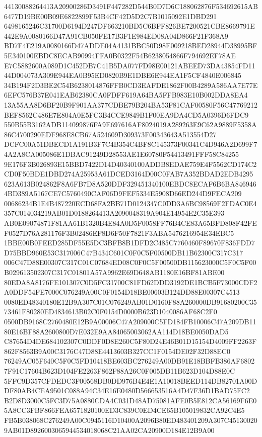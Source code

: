 \documentclass[UTF8,fontset=fandol,zihao=-4,a4paper]{ctexart}
\begin{document}
{{44130088264413A20900286D3491F447282D544B0D7D6C188062876F534692615AB6477D19BE00B09E6822899F53B4CF42D5D2C7B1015092E1DBD291
6498165246C31700D6194D247DF663210BD5C6BFF826BE7200521CBE8669791E442E9A0080166D47A91CB050FE17B3F1E984ED08A04D866F21F368A9
BD7F4E219A0080166D47ADDE04A4131BBC50D98E009218BED28944D38995BF5E340100EBDC8ECAB90994FFA0B0322F54B6238054866F794692EF78AE
E7C5882600A089D1C452DB7C41B5DA077FD98E00121ABEED73DA43854FD1144D004073A309E944EA0B95ED0820B9E1DBE6E944EA1F5CF4840E006845
34B194F2D3BE2C54B6238014876FFB0CD3EAFDE1862F00B4289A586AA7E77E6EFC576B37E041EAB62380CA0FDFF619A64BA5FFB983E10B002DDA8EA4
13A55AA8D6BF20B9F901AA377CDBE79B204BA53F81CAF00580F56C47769212BEF8562C486E7E804A0E5FC3B4CCE9849B1F00EA9DA4CD5A0396D6FDC9
550B55B3162ADB114099876FA9E697616AF8024019A289263E9C62A9889F5358A86C4700290EDF968E8CB67A524609D309373F00343643A513554D27
DCFC00A51DBECD1A191B3F7C4B354C4BF8C145373F00341C4D946A2D699F74A2A8CA005086E1DBAC91249D28553AE1E60780F54413491FFF58C84255
9E176F3B026893E15BBD7422D14D40340100ADDB8EDAE759E4F5562CD174C2CD0F50BDE1DBD274A25953A61DCED3164D00C0FAB7A352BDAD2EDB4295
623A613B024862F8A6FB7D8A520DDF329451340100EBDC8ECAF6B6BA8469464BD389A5167CE7C5760490CAF06D9FEF5334E5908D66ED244D9FECA209
00686234B1E4B487220ECD68FA2BB71D0124347C0DD3A6BC98569F2FDAC0E4357C014034219AB01D0188264413A2090048319A904E14954E2C35E393
AB0E09074871F81AA61B1320B4E84A0D5F0058FF76B4CE83A65BFD808F42FEF0527D76A281176F3B02486EF8D6F50F7821F3ABA5476216954E34EBC5
1BBE00B0FEED285DF55E5DC3BFB8B1DFD2C485C7760460F89670F836FDD7D75BBD960E53C317006C47B434C601C0F0C5F00500DB11B62300C317C317
006C47D88E00307C317C01C07684ED08C0F0C5F00500DB115623000C5F0C5F00B029613502307C317C01801A57A9962E69D648AB1180E16BF81ABE00
80EDA8A8176FE101307C0D5FC31700C81FD62DDD3192DE1BCB5F73000CDF2A0DDF54FE7000C076249A00C0F0154D18BE00603B124DD88E00307C4513
0080ED48340180E12B9A307C01C076249AB01D0160F88A260000DB91680200C3573461F80280ED4834613B02C0F0154D0000B623D1040086AF68C2F0
0500DB9168C2760480E12B9A00006C47A209000C5FD184FB10006C47A209DB1180E16BF88A2600800D7E032E9AA84065003062AA114D18BE0050DAD5
C87654D4DE684102307C0DDF0D8E260C5F80D24E46B01D15154D4009FF2263F862F8563B9A00C3176C47D88E4413603B327CC1F0154DE02F32D88EC0
76249AC05F640C5F0C5FD10418BE603BC276249A00DB91E18BBFB386AF68027F91C17604B623D104FE2263F862F88A26C0F005DB11B623D104D88E0C
5FFC9D357CFDEDC3F00568DB0DD976B4E4E1A10018BEED114DB82701A00DDF80AB4CEA9501C088A94C34E16E0480D566653516A4D47F36D1BAD75FC2
B2D8D3000C5FC3D75A0880CDA4C031D48AD75081AFE0B5E812CA56169F6E05A8CC3FBF866FEA6571820100ED3C839C0ED4CE65B105019832CA92C4E5
FB5B038068C276249A00C0945116D10400A2096B80ED483401209A307C451300209AB01D8926003065944534018068C21AA02CA20900D184E12B9A00
}}
\end{document}

